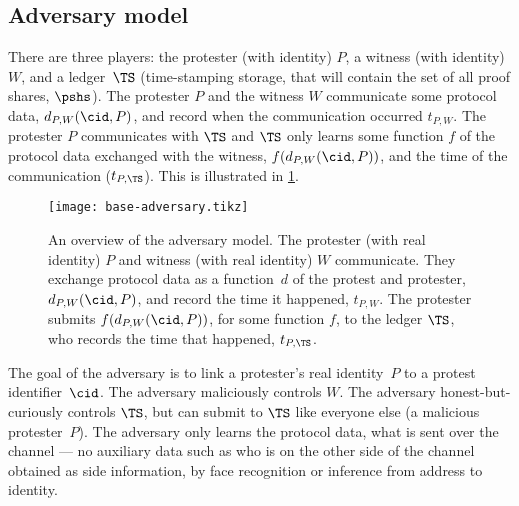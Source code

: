 \subsection{Adversary model}%
\label{formal-adversary-model}

There are three players: the protester (with identity) \(P\), a witness (with 
identity) \(W\), and a ledger~\(\TS\) (\ie time-stamping storage, that will 
contain the set of all proof shares, \(\pshs\)).
The protester \(P\) and the witness \(W\) communicate some protocol data,
\(d_{P,W}(\cid, P)\), and record when the communication occurred \(t_{P,W}\).
The protester \(P\) communicates with \(\TS\) and \(\TS\) only learns 
some function \(f\) of the protocol data exchanged with the witness,
\(f(d_{P,W}(\cid, P))\), and the time of the 
communication (\(t_{P,\TS}\)).
This is illustrated in \cref{fig:base-adversary}.

\begin{figure}
  \centering
  \texttt{[image: base-adversary.tikz]}
  \caption{\label{fig:base-adversary}%
    An overview of the adversary model.
    The protester (with real identity) \(P\) and witness (with real identity) 
    \(W\) communicate.
    They exchange protocol data as a function~\(d\) of the protest and 
    protester, \(d_{P,W}(\cid, P)\), and record the time it happened, 
    \(t_{P,W}\).
    The protester submits \(f(d_{P,W}(\cid, P))\), for some function \(f\), to 
    the ledger \(\TS\), who records the time that happened, \(t_{P,\TS}\).
  }
\end{figure}

The goal of the adversary is to link a protester's real identity~\(P\) to a 
protest identifier~\(\cid\).
The adversary maliciously controls \(W\).
The adversary honest-but-curiously controls \(\TS\), but can submit to \(\TS\) 
like everyone else (\eg a malicious protester~\(P\)).
The adversary only learns the protocol data, \ie what is sent over the channel 
--- no auxiliary data such as who is on the other side of the channel obtained
  as side information, \eg by face recognition or inference from address
  to identity.

